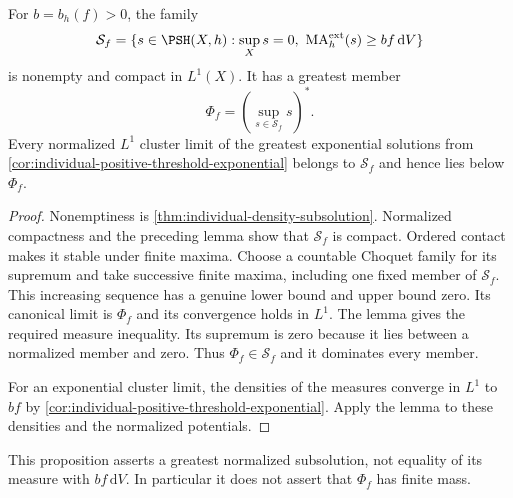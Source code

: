 \begin{proposition}\label{prop:greatest-normalized-threshold}
For $b=b_h(f)>0$, the family
\[
 \mathcal S_f=\{s\in\PSH(X,h):\sup_Xs=0,\
             \mathrm{MA}^{\mathrm{ext}}_h(s)\geq bf\,\mathrm{d}V\}
\]
is nonempty and compact in $L^1(X)$. It has a greatest member
\[
 \Phi_f=\left(\sup_{s\in\mathcal S_f}s\right)^*.
\]
Every normalized $L^1$ cluster limit of the greatest exponential solutions from \cref{cor:individual-positive-threshold-exponential} belongs to $\mathcal S_f$ and hence lies below $\Phi_f$.
\end{proposition}
\begin{proof}
Nonemptiness is \cref{thm:individual-density-subsolution}. Normalized compactness and the preceding lemma show that $\mathcal S_f$ is compact. Ordered contact makes it stable under finite maxima. Choose a countable Choquet family for its supremum and take successive finite maxima, including one fixed member of $\mathcal S_f$. This increasing sequence has a genuine lower bound and upper bound zero. Its canonical limit is $\Phi_f$ and its convergence holds in $L^1$. The lemma gives the required measure inequality. Its supremum is zero because it lies between a normalized member and zero. Thus $\Phi_f\in\mathcal S_f$ and it dominates every member.

For an exponential cluster limit, the densities of the measures converge in $L^1$ to $bf$ by \cref{cor:individual-positive-threshold-exponential}. Apply the lemma to these densities and the normalized potentials.
\end{proof}

This proposition asserts a greatest normalized subsolution, not equality of its measure with $bf\,\mathrm{d}V$. In particular it does not assert that $\Phi_f$ has finite mass.
